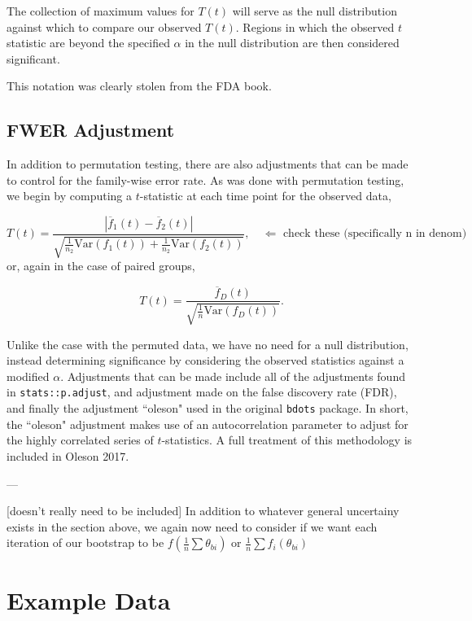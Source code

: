 \documentclass{article}
\newcommand{\xt}{\texttt}%
\begin{document}
The collection of maximum values for $T(t)$ will serve as the null distribution against which to compare our observed $T(t)$. Regions in which the observed $t$ statistic are beyond the specified $\alpha$ in the null distribution are then considered significant.

This notation was clearly stolen from the FDA book. 

\subsection{FWER Adjustment}

In addition to permutation testing, there are also adjustments that can be made to control for the family-wise error rate. As was done with permutation testing, we begin by computing a $t$-statistic at each time point for the observed data, 

\begin{equation}
T(t) = \frac{|\overline{f}_1(t) - \overline{f}_2(t)|}{\sqrt{\frac{1}{n_2} \text{Var}(f_1(t)) + \frac{1}{n_2} \text{Var}(f_2(t))}}, \quad \Leftarrow \text{ check these (specifically n in denom)}
\end{equation}
or, again in the case of paired groups, 

\begin{equation}
T(t) = \frac{\overline{f}_D(t)}{\sqrt{\frac1n \text{Var}(f_D(t))}}.
\end{equation}

Unlike the case with the permuted data, we have no need for a null distribution, instead determining significance by considering the observed statistics against a modified $\alpha$.  Adjustments that can be made include all of the adjustments found in \xt{stats::p.adjust}, and adjustment made on the false discovery rate (FDR), and finally the adjustment ``oleson" used in the original \xt{bdots} package. In short, the ``oleson" adjustment makes use of an autocorrelation parameter to adjust for the highly correlated series of $t$-statistics. A full treatment of this methodology is included in Oleson 2017.

---

[doesn't really need to be included] In addition to whatever general uncertainy exists in the section above, we again now need to consider if we want each iteration of our bootstrap to be $f ( \frac1n \sum \theta_{bi})$ or $ \frac1n \sum f_i (\theta_{bi})$

\section{Example Data}
\end{document}

